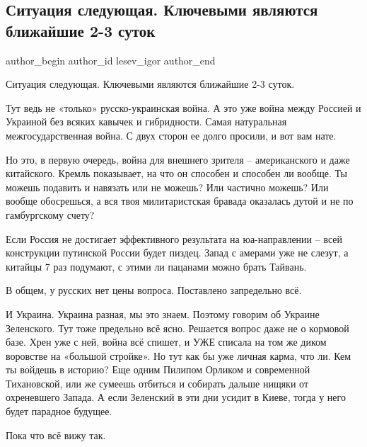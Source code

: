 
 
 
 
 
 
\subsection{Ситуация следующая. Ключевыми являются ближайшие 2-3 суток}
\label{sec:24_02_2022.tg.lesev_igor.1.situacia}
 
\ifcmt
 author_begin
   author_id lesev_igor
 author_end
\fi

Ситуация следующая. Ключевыми являются ближайшие 2-3 суток.

Тут ведь не «только» русско-украинская война. А это уже война между Россией и
Украиной без всяких кавычек и гибридности. Самая натуральная межгосударственная
война. С двух сторон ее долго просили, и вот вам нате.

Но это, в первую очередь, война для внешнего зрителя – американского и даже
китайского. Кремль показывает, на что он способен и способен ли вообще. Ты
можешь подавить и навязать или не можешь? Или частично можешь? Или вообще
обосрешься, а вся твоя милитаристская бравада оказалась дутой и не по
гамбургскому счету?

Если Россия не достигает эффективного результата на юа-направлении – всей
конструкции путинской России будет пиздец. Запад с амерами уже не слезут, а
китайцы 7 раз подумают, с этими ли пацанами можно брать Тайвань.

В общем, у русских нет цены вопроса. Поставлено запредельно всё.

И Украина. Украина разная, мы это знаем. Поэтому говорим об Украине Зеленского.
Тут тоже предельно всё ясно. Решается вопрос даже не о кормовой базе. Хрен уже
с ней, война всё спишет, и УЖЕ списала на том же диком воровстве на «большой
стройке». Но тут как бы уже личная карма, что ли. Кем ты войдешь в историю? Еще
одним Пилипом Орликом и современной Тихановской, или же сумеешь отбиться и
собирать дальше нищяки от охреневшего Запада. А если Зеленский в эти дни усидит
в Киеве, тогда у него будет парадное будущее.

Пока что всё вижу так.
